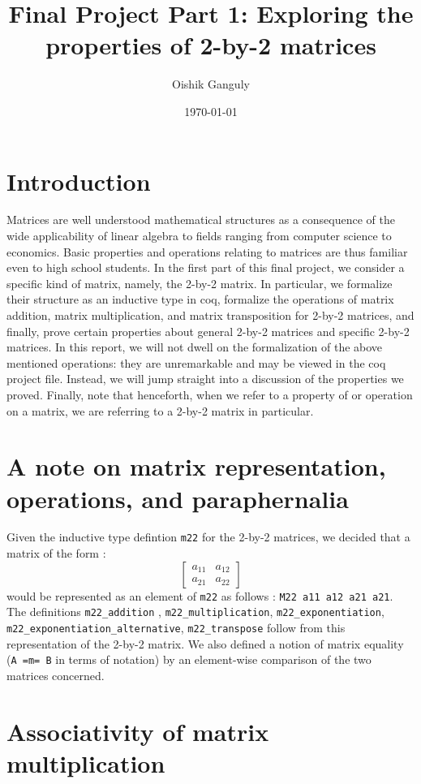 \documentclass[12pt, a4paper]{article}
\title{Final Project Part 1: Exploring the properties of 2-by-2 matrices}
\author{Oishik Ganguly}
\date{\today}
\begin{document}
\maketitle
\tableofcontents

\section {Introduction}
Matrices are well understood mathematical structures as a consequence of the
wide applicability of linear algebra to fields ranging from computer science to
economics. Basic properties and operations relating to matrices are thus familiar
even to high school students. In the first part of this final project, we consider
a specific kind of matrix, namely, the 2-by-2 matrix. In particular, we 
formalize their structure as an inductive type in coq, formalize 
the operations of matrix addition, matrix multiplication, and matrix transposition
for 2-by-2 matrices, and finally, prove certain properties about general 2-by-2 
matrices and specific 2-by-2 matrices. In this report, we will not dwell on the
formalization of the above mentioned operations:  they are unremarkable and may be viewed in the coq project file. Instead,
we will jump straight into a discussion of the properties we proved. Finally, note 
that henceforth, when we refer to a property of or operation on a matrix, we are 
referring to a 2-by-2 matrix in particular. 

\section{A note on matrix representation, operations, and paraphernalia}
Given the inductive type defintion \verb-m22- for the 2-by-2 matrices, we decided that a matrix
of the form :
$$ 
\begin{bmatrix}
  a_{11} & a_{12} \\
  a_{21} & a_{22}
\end{bmatrix}
$$
would be represented as an element of \verb-m22- as follows : 
\verb-M22 a11 a12 a21 a21-. The definitions \verb-m22_addition- ,
\verb-m22_multiplication-, \verb-m22_exponentiation-, 
\verb-m22_exponentiation_alternative-, \verb-m22_transpose- follow from
this representation of the 2-by-2 matrix. We also defined
a notion of matrix equality (\verb-A =m= B- in terms of notation) by an 
element-wise comparison of the two matrices concerned. 


\section{Associativity of matrix multiplication}
\end{document}
